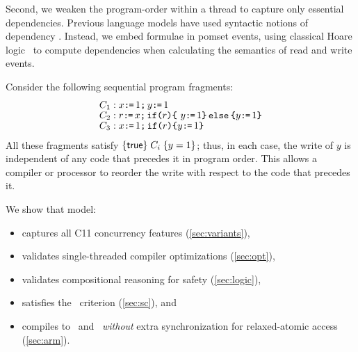 Second, we weaken the program-order within a thread to capture only essential dependencies.
Previous language models have used syntactic notions of dependency \cite{Batty:2011:MCC:1926385.1926394}.
Instead, we embed formulae in pomset events, using classical
Hoare logic~\citep{Hoare:1969:ABC:363235.363259, gordonHoare} to compute dependencies when calculating the semantics of read and write events. %

Consider the following sequential program fragments:
\begin{align*}
  & C_1: x \texttt{:}\mkern-1mu\texttt{=}\, 1 \texttt{;}\,\allowbreak y \texttt{:}\mkern-1mu\texttt{=}\, 1
  \\[-1ex] & C_2: r \texttt{:}\mkern-1mu\texttt{=}\, x \texttt{;}\,\allowbreak \texttt{if}\allowbreak\texttt{(}r\texttt{)} \allowbreak\texttt{\{}\ y \texttt{:}\mkern-1mu\texttt{=}\, 1 \texttt{\}}\,\allowbreak\texttt{else}\allowbreak\,\texttt{\{} y \texttt{:}\mkern-1mu\texttt{=}\, 1  \texttt{\}}
  \\[-1ex] & C_3: x \texttt{:}\mkern-1mu\texttt{=}\, 1 \texttt{;}\,\allowbreak \texttt{if}\allowbreak\texttt{(}r\texttt{)} \allowbreak\texttt{\{} y \texttt{:}\mkern-1mu\texttt{=}\, 1 \texttt{\}}
\end{align*}
All these fragments satisfy  $\{\mathsf{true}\}\allowbreak\;C_i\;\allowbreak\{y =1\}$; thus, in each case, the write of $y$ is independent of
any code that precedes it in program order.  This allows a compiler or processor to reorder the write with respect to the code that precedes it.


We show that model:
\begin{itemize}
\item captures all C11 concurrency features  %
  (\textsection\ref{sec:variants}),

\item  validates single-threaded
  compiler optimizations %
  (\textsection\ref{sec:opt}),

\item validates compositional reasoning for safety %
  (\textsection\ref{sec:logic}),

\item  satisfies the \drfsc\ criterion  (\textsection\ref{sec:sc}), and

\item compiles to \armeight\ and \tso\ {\em without} extra synchronization for relaxed-atomic access  (\textsection\ref{sec:arm}).

\end{itemize}

